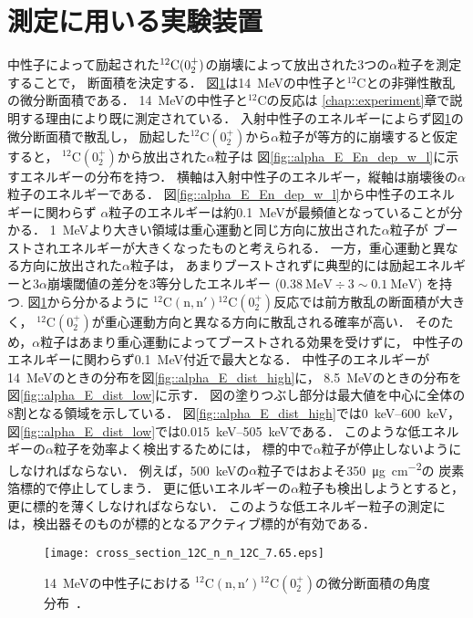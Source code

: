 \documentclass[../master]{subfiles}
\begin{document}
\section{測定に用いる実験装置}
\label{seq::detector_using_experiment}
中性子によって励起された${}^{12}{\rm C} (0_2^+)$の崩壊によって放出された3つの$\alpha$粒子を測定することで，
断面積を決定する．
図\ref{fig::sig_angle_dist}は\SI{14}{\mega\electronvolt}の中性子と${}^{12}\mathrm{C}$との非弾性散乱の微分断面積である．
\SI{14}{\mega\electronvolt}の中性子と${}^{12}\mathrm{C}$の反応は
\ref{chap::experiment}章で説明する理由により既に測定されている．
入射中性子のエネルギーによらず図\ref{fig::sig_angle_dist}の微分断面積で散乱し，
励起した${}^{12}\mathrm{C}(0_2^+)$から$\alpha$粒子が等方的に崩壊すると仮定すると，
${}^{12}\mathrm{C} (0_2^+)$から放出された$\alpha$粒子は
図\ref{fig::alpha_E_En_dep_w_l}に示すエネルギーの分布を持つ．
横軸は入射中性子のエネルギー，縦軸は崩壊後の$\alpha$粒子のエネルギーである．
図\ref{fig::alpha_E_En_dep_w_l}から中性子のエネルギーに関わらず
$\alpha$粒子のエネルギーは約\SI{0.1}{\mega\electronvolt}が最頻値となっていることが分かる．
\SI{1}{\mega\electronvolt}より大きい領域は重心運動と同じ方向に放出された$\alpha$粒子が
ブーストされエネルギーが大きくなったものと考えられる．
一方，重心運動と異なる方向に放出された$\alpha$粒子は，
あまりブーストされずに典型的には励起エネルギーと3$\alpha$崩壊閾値の差分を3等分したエネルギー
($\SI{0.38}{\mega\electronvolt}\div 3 \sim \SI{0.1}{\mega\electronvolt}$) を持つ.
図\ref{fig::sig_angle_dist}から分かるように
${}^{12}\mathrm{C}(\mathrm{n},\mathrm{n}'){}^{12}\mathrm{C}(0_2^+)$反応では前方散乱の断面積が大きく，
${}^{12}\mathrm{C} (0_2^+)$が重心運動方向と異なる方向に散乱される確率が高い．
そのため，$\alpha$粒子はあまり重心運動によってブーストされる効果を受けずに，
中性子のエネルギーに関わらず\SI{0.1}{\mega\electronvolt}付近で最大となる．
中性子のエネルギーが\SI{14}{\mega\electronvolt}のときの分布を図\ref{fig::alpha_E_dist_high}に，
\SI{8.5}{\mega\electronvolt}のときの分布を図\ref{fig::alpha_E_dist_low}に示す．
図の塗りつぶし部分は最大値を中心に全体の8割となる領域を示している．
図\ref{fig::alpha_E_dist_high}では\SIrange{0}{600}{\kilo\electronvolt}，
図\ref{fig::alpha_E_dist_low}では\SIrange{0.015}{505}{\kilo\electronvolt}である．
このような低エネルギーの$\alpha$粒子を効率よく検出するためには，
標的中で$\alpha$粒子が停止しないようにしなければならない．
例えば，\SI{500}{\kilo\electronvolt}の$\alpha$粒子ではおよそ\SI{350}{\micro\gram\per\square\centi\metre}の
炭素箔標的で停止してしまう．
更に低いエネルギーの$\alpha$粒子も検出しようとすると，更に標的を薄くしなければならない．
このような低エネルギー粒子の測定には，検出器そのものが標的となるアクティブ標的が有効である．
\begin{figure}
  \centering
  \texttt{[image: cross\_section\_12C\_n\_n\_12C\_7.65.eps]}
  \caption{\SI{14}{\mega\electronvolt}の中性子における
    ${}^{12}\mathrm{C}(\mathrm{n},\mathrm{n}'){}^{12}\mathrm{C} (0_2^+)$の微分断面積の角度分布~\cite{kondoetal}．}
  \label{fig::sig_angle_dist}
\end{figure}
\end{document}
